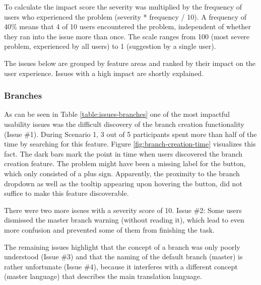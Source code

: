 To calculate the impact score the severity was multiplied by the frequency of users who experienced the problem (severity * frequency / 10). A frequency of 40\% means that 4 of 10 users encountered the problem, independent of whether they ran into the issue more than once. The scale ranges from 100 (most severe problem, experienced by all users) to 1 (suggestion by a single user).

The issues below are grouped by feature areas and ranked by their impact on the user experience. Issues with a high impact are shortly explained.

\subsubsection{Branches}
As can be seen in Table \ref{table:issues-branches} one of the most impactful usability issues was the difficult discovery of the branch creation functionality (Issue \#1). During Scenario 1, 3 out of 5 participants spent more than half of the time by searching for this feature. Figure \ref{fig:branch-creation-time} visualizes this fact. The dark bars mark the point in time when users discovered the branch creation feature. The problem might have been a missing label for the button, which only consisted of a plus sign. Apparently, the proximity to the branch dropdown as well as the tooltip appearing upon hovering the button, did not suffice to make this feature discoverable.

There were two more issues with a severity score of 10. Issue \#2: Some users dismissed the master branch warning (without reading it), which lead to even more confusion and prevented some of them from finishing the task.

The remaining issues highlight that the concept of a branch was only poorly understood (Issue \#3) and that the naming of the default branch (master) is rather unfortunate (Issue \#4), because it interferes with a different concept (master language) that describes the main translation language.

